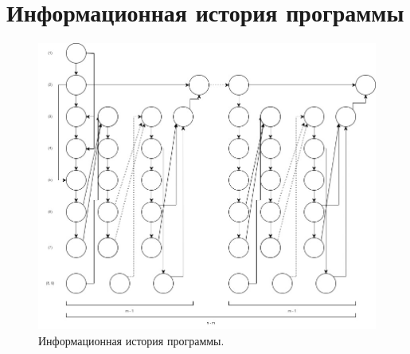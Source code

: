 \documentclass[12pt]{report}
\begin{document}
\section{Информационная история программы}

\begin{figure}[hp!]
	\centering
	\includegraphics[scale=0.6]{report_files/information_history.jpg}
	\caption{Информационная история программы.}
	\label{fig:mpr}
\end{figure}




\end{document}
